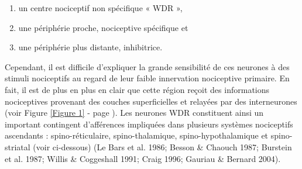 \documentclass[a4paper,12pt,twoside]{report}
\begin{document}
\begin{enumerate}
\item un centre nociceptif non spécifique « WDR », 
\item une périphérie proche, nociceptive spécifique et 
\item une périphérie plus distante, inhibitrice.
\end{enumerate}

Cependant, il est difficile d'expliquer la grande sensibilité de ces neurones à des stimuli nociceptifs au regard de leur faible innervation nociceptive primaire. En fait, il est de plus en plus en clair que cette région reçoit des informations nociceptives provenant des couches superficielles et relayées par des interneurones (voir Figure \ref{Figure 1} - page \pageref{Figure 1}). Les neurones WDR constituent ainsi un important contingent d'afférences impliquées dans plusieurs systèmes nociceptifs ascendants : spino-réticulaire, spino-thalamique, spino-hypothalamique et spino-striatal (voir ci-dessous) (Le Bars et al. 1986; Besson \& Chaouch 1987; Burstein et al. 1987; Willis \& Coggeshall 1991; Craig 1996; Gauriau \& Bernard 2004). 
\end{document}
